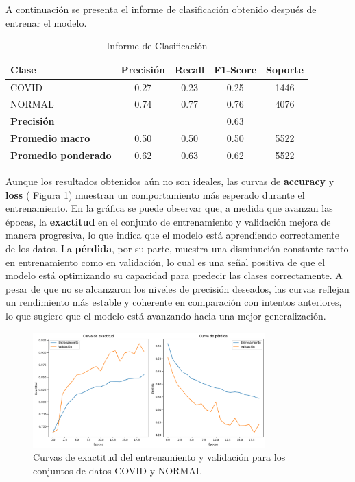 \documentclass{article}
\begin{document}
	A continuación se presenta el informe de clasificación obtenido después de entrenar el modelo.
	
	
\begin{table}[ht]
	\centering
	\caption{Informe de Clasificación}
	\label{tab:classification_report}
	\begin{tabular}{lcccc}
		\toprule
		\textbf{Clase}       & \textbf{Precisión} & \textbf{Recall} & \textbf{F1-Score} & \textbf{Soporte} \\ 
		\midrule
		COVID                & 0.27               & 0.23            & 0.25              & 1446             \\ 
		NORMAL               & 0.74               & 0.77            & 0.76              & 4076             \\ 
		\midrule
		\textbf{Precisión}   &  	& &{0.63}                                    &                  \\ 
		\midrule
		\textbf{Promedio macro}   & 0.50               & 0.50            & 0.50              & 5522             \\ 
		\textbf{Promedio ponderado}& 0.62               & 0.63            & 0.62              & 5522             \\ 
		\bottomrule
	\end{tabular}
\end{table}


	
	Aunque los resultados obtenidos aún no son ideales, las curvas de \textbf{accuracy} y \textbf{loss} ( Figura \ref{fig:accuracy_curves2}) muestran un comportamiento más esperado durante el entrenamiento. En la gráfica se puede observar que, a medida que avanzan las épocas, la \textbf{exactitud} en el conjunto de entrenamiento y validación mejora de manera progresiva, lo que indica que el modelo está aprendiendo correctamente de los datos. La \textbf{pérdida}, por su parte, muestra una disminución constante tanto en entrenamiento como en validación, lo cual es una señal positiva de que el modelo está optimizando su capacidad para predecir las clases correctamente. A pesar de que no se alcanzaron los niveles de precisión deseados, las curvas reflejan un rendimiento más estable y coherente en comparación con intentos anteriores, lo que sugiere que el modelo está avanzando hacia una mejor generalización.
	
	
	\begin{figure}[h!]
		\centering
		\includegraphics[width=0.8\textwidth]{images/acc-loss.png}
		\caption{Curvas de exactitud del entrenamiento y validación para los conjuntos de datos COVID y NORMAL}
		\label{fig:accuracy_curves2}
	\end{figure}
	
\end{document}
